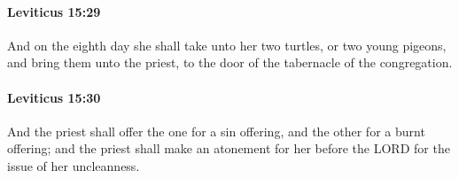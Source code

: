 		\paragraph{Leviticus 15:29} %
			\label{LEVITICUS-15-29}

			And on the eighth day she shall take unto her two turtles, or two young pigeons, and bring them unto the priest, to the door of the tabernacle of the congregation.


		\paragraph{Leviticus 15:30} %
			\label{LEVITICUS-15-30}

			And the priest shall offer the one for a sin offering, and the other for a burnt offering; and the priest shall make an atonement for her before the LORD for the issue of her uncleanness.


